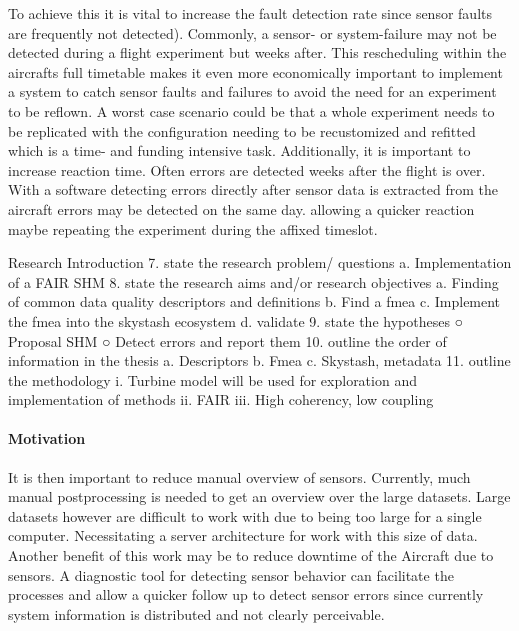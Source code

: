 To achieve this it is vital to increase the fault detection rate since sensor faults are frequently not detected). Commonly, a sensor- or system-failure may not be detected during a flight experiment but weeks after. This rescheduling within the aircrafts full timetable makes it even more economically important to implement a system to catch sensor faults and failures to avoid the need for an experiment to be reflown. A worst case scenario could be that a whole experiment needs to be replicated with the configuration needing to be recustomized and refitted which is a time- and funding intensive task.
Additionally, it is important to increase reaction time. Often errors are detected weeks after the flight is over. With a software detecting errors directly after sensor data is extracted from the aircraft errors may be detected on the same day. allowing a quicker reaction maybe repeating the experiment during the affixed timeslot.





Research Introduction
	7. state the research problem/ questions
		a. Implementation of a FAIR SHM
	8. state the research aims and/or research objectives
		a. Finding of common data quality descriptors and definitions
		b. Find a fmea
		c. Implement the fmea into the skystash ecosystem
		d. validate
	9. state the hypotheses
		○ Proposal SHM
		○ Detect errors and report them
	10. outline the order of information in the thesis
		a. Descriptors
		b. Fmea
		c. Skystash, metadata
	11. outline the methodology
		i. Turbine model will be used for exploration and implementation of methods
		ii. FAIR
		iii. High coherency, low coupling








\paragraph{Motivation}

It is then important to reduce manual overview of sensors. Currently, much manual postprocessing is needed to get an overview over the large datasets. Large datasets however are difficult to work with due to being too large for a single computer. Necessitating a server architecture for work with this size of data.
Another benefit of this work may be to reduce downtime of the Aircraft due to sensors. A diagnostic tool for detecting sensor behavior can facilitate the processes and allow a quicker follow up to detect sensor errors since currently system information is distributed and not clearly perceivable.

